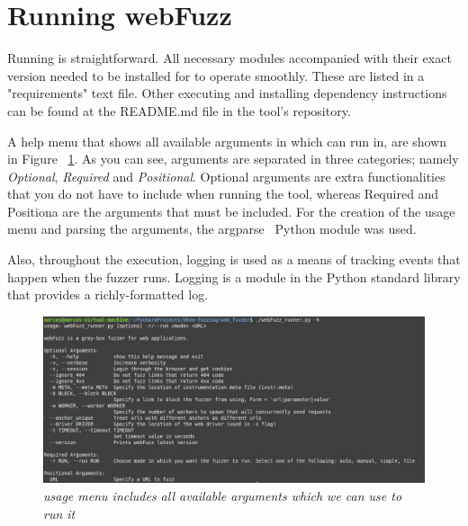 \section{Running webFuzz}
Running \pname{} is straightforward. All necessary modules accompanied with their exact version needed to be installed for \pname{} to operate smoothly. These are listed in a "requirements" text file. Other executing and installing dependency instructions can be found at the README.md file in the tool's repository.

A help menu that shows all available arguments in which \pname{} can run in, are shown in Figure ~\ref{fig:argparser_menu}. As you can see, arguments are separated in three categories; namely \emph{Optional}, \emph{Required} and \emph{Positional}. Optional arguments are extra functionalities that you do not have to include when running the tool, whereas Required and Positiona are the arguments that must be included. For the creation of the usage menu and parsing the arguments, the argparse~\cite{argparse} Python module was used.

Also, throughout the execution, logging is used as a means of tracking events that happen when the fuzzer runs. Logging is a module in the Python standard library that provides a richly-formatted log.

\begin{figure}[ht]
 \centering
 \captionsetup{justification=centering}
 \includegraphics[width=\linewidth]{figures/argparser_menu.jpg}
 \caption[\pname{} usage menu]{\textit{\pname{} usage menu includes all available arguments which we can use to run it}}
 \label{fig:argparser_menu}
\end{figure}
